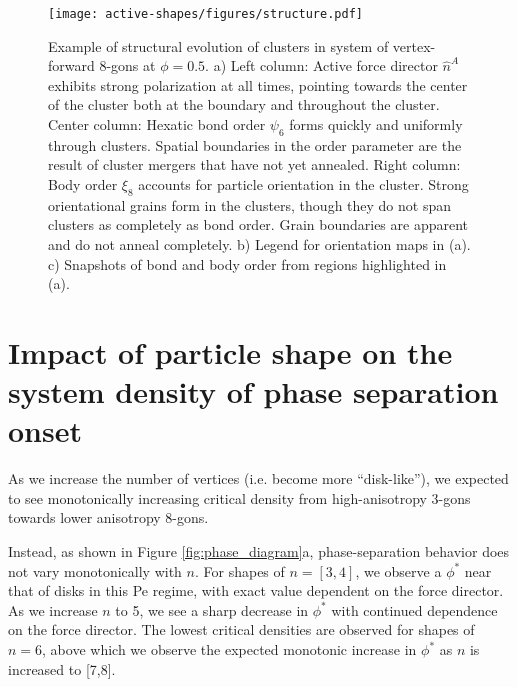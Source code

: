 \begin{figure}[t]
\begin{center}
\texttt{[image: active-shapes/figures/structure.pdf]}
\caption{
Example of structural evolution of clusters in system of vertex-forward 8-gons at $\phi=0.5$.
a) Left column: Active force director $\hat{n}^A$ exhibits strong polarization at all times, pointing towards the center of the cluster both at the boundary and throughout the cluster.
Center column: Hexatic bond order $\psi_6$ forms quickly and uniformly through clusters. Spatial boundaries in the order parameter are the result of cluster mergers that have not yet annealed.
Right column: Body order $\xi_8$ accounts for particle orientation in the cluster. Strong orientational grains form in the clusters, though they do not span clusters as completely as bond order. Grain boundaries are apparent and do not anneal completely.
b) Legend for orientation maps in (a).
c) Snapshots of bond and body order from regions highlighted in (a).
}
\label{fig:structure}
\end{center}
\end{figure}


\section{Impact of particle shape on the system density of phase separation onset}

As we increase the number of vertices (i.e. become more ``disk-like''), we expected to see monotonically increasing critical density\cite{Dijkstra_2019_JChemPhys} from high-anisotropy 3-gons towards lower anisotropy 8-gons.

Instead, as shown in Figure \ref{fig:phase_diagram}a, phase-separation behavior does not vary monotonically with $n$.
For shapes of  $n=[3,4]$, we observe a $\phi^*$ near that of disks in this Pe regime, with exact value dependent on the force director.
As we increase $n$ to 5, we see a sharp decrease in $\phi^*$ with continued dependence on the force director.
The lowest critical densities are observed for shapes of $n=6$, above which we observe the expected monotonic increase in $\phi^*$ as $n$ is increased to [7,8].\cite{anisotropy_comp}

